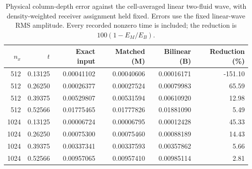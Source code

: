 \begin{table}[tbp]\centering\small
\caption{Physical column-depth error against the cell-averaged linear two-fluid wave, with density-weighted receiver assignment held fixed. Errors use the fixed linear-wave RMS amplitude. Every recorded nonzero time is included; the reduction is $100(1-E_M/E_B)$.}\label{tab:physical-refinement}
\begin{tabular}{@{}rrrrrr@{}}\toprule
$n_x$ & $t$ & Exact input & Matched (M) & Bilinear (B) & Reduction (\%)\\\midrule
512 & 0.13125 & 0.00041102 & 0.00040606 & 0.00016171 & -151.10\\
512 & 0.26250 & 0.00026377 & 0.00027524 & 0.00079983 & 65.59\\
512 & 0.39375 & 0.00529807 & 0.00531594 & 0.00610920 & 12.98\\
512 & 0.52566 & 0.01775465 & 0.01777826 & 0.01881090 & 5.49\\
\midrule
1024 & 0.13125 & 0.00006724 & 0.00006795 & 0.00012428 & 45.33\\
1024 & 0.26250 & 0.00075300 & 0.00075460 & 0.00088189 & 14.43\\
1024 & 0.39375 & 0.00337341 & 0.00337593 & 0.00357862 & 5.66\\
1024 & 0.52566 & 0.00957065 & 0.00957410 & 0.00985114 & 2.81\\
\bottomrule\end{tabular}
\end{table}
